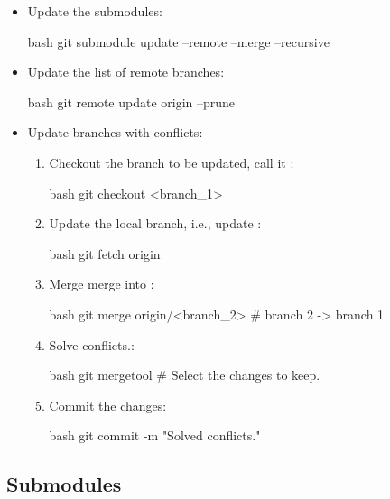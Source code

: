 \begin{itemize}
    \item Update the submodules:
    \begin{mintedbox}{bash}
git submodule update --remote --merge --recursive
    \end{mintedbox}
    \item Update the list of remote branches:
    \begin{mintedbox}{bash}
git remote update origin --prune
    \end{mintedbox}
    \item Update branches with conflicts:
    \begin{enumerate}
        \item Checkout the branch to be updated, call it :
        \begin{mintedbox}{bash}
git checkout <branch_1>
        \end{mintedbox}
        \item Update the local branch, i.e., update :
        \begin{mintedbox}{bash}
git fetch origin
        \end{mintedbox}
        \item Merge merge  into :
        \begin{mintedbox}{bash}
git merge origin/<branch_2>  # branch 2 -> branch 1
        \end{mintedbox}
        \item Solve conflicts.:
        \begin{mintedbox}{bash}
git mergetool  # Select the changes to keep.
        \end{mintedbox}
        \item Commit the changes:
        \begin{mintedbox}{bash}
git commit -m "Solved conflicts."
        \end{mintedbox}
    \end{enumerate}
\end{itemize}


\subsection{Submodules}

